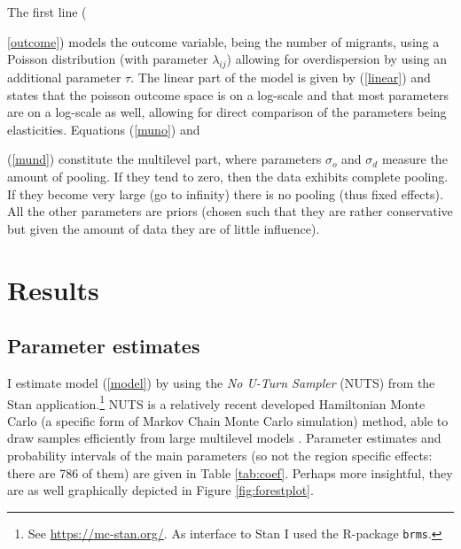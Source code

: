 \documentclass[fleqn,10pt]{SelfArx} %
\begin{document}
        The first line ({\ref{outcome}) models the outcome variable,
          being the number of migrants, using a Poisson distribution
          (with parameter $\lambda_{ij}$) allowing for overdispersion
          by using an additional parameter $\tau$. The linear part of
          the model is given by (\ref{linear}) and states that the
          poisson outcome space is on a log-scale and that most
          parameters are on a log-scale as well, allowing for direct
          comparison of the parameters being elasticities. Equations
          (\ref{muno}) and {(\ref{mund}) constitute the multilevel
            part, where parameters $\sigma_o$ and $\sigma_d$ measure
            the amount of pooling. If they tend to zero, then the
            data exhibits complete pooling. If they become very large
            (go to infinity) there is no pooling (thus fixed
            effects). All the other parameters are priors (chosen such
            that they are rather conservative but given the amount of
            data they are of little influence).
          
        \section{Results}

        \subsection{Parameter estimates}
        
        I estimate model (\ref{model}) by using the \emph{No U-Turn
          Sampler} (NUTS) from the Stan application.\footnote{See \href{https://mc-stan.org/}{https://mc-stan.org/}. As interface to Stan
          \citep[see for an overview article of
          Stan][]{carpenter2017stan} I used the R-package \citep{brms} \texttt{brms}.} NUTS is a relatively recent developed Hamiltonian Monte Carlo (a specific form of Markov
        Chain Monte Carlo simulation) method, able to draw samples
        efficiently from large multilevel models
        \citep{hoffman2014no}. Parameter estimates and probability
        intervals of the main parameters (so not the region specific
        effects: there are 786 of them) are given in Table
        \ref{tab:coef}. Perhaps more insightful, they are as well graphically
        depicted in Figure \ref{fig:forestplot}.

}}
\end{document}
